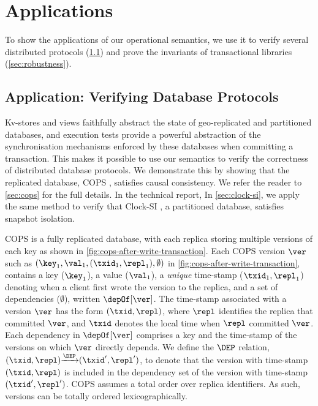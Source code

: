 \section{Applications}
\label{sec:applications}
\label{sec:program-analysis}

To show the applications of our operational semantics, 
we use it to verify several distributed protocols (\cref{sec:verify-impl}) and
prove the invariants of transactional libraries (\cref{sec:robustness}).

\subsection{Application: Verifying Database Protocols}
\label{sec:verify-impl}
Kv-stores and views faithfully abstract the state of geo-replicated and partitioned
databases, and execution tests provide a powerful abstraction of the synchronisation mechanisms 
enforced by these databases when committing a transaction. 
This makes it possible to use our 
semantics to verify the correctness of distributed database protocols. 
We demonstrate this by showing that the replicated database,
COPS \cite{cops}, satisfies causal consistency.
We refer the reader to \cref{sec:cops} for the full details.
\ifTechRepEdits%
In the technical report,
\else%
In \cref{sec:clock-si}, 
\fi
we apply the same method to verify that 
Clock-SI \cite{clocksi}, a partitioned database, satisfies snapshot isolation.



COPS is a fully replicated database, with each replica storing multiple versions of each key as shown in \cref{fig:cops-after-write-transaction}. 
Each COPS version \( \ver \)
such as \( (\key_1,\val_1,(\txid_1,\repl_1), \emptyset) \) in \cref{fig:cops-after-write-transaction},
contains a key ($\key_1$), a value ($\val_1$), a \emph{unique} time-stamp ($\txid_1, \repl_1$) denoting
when a client first wrote the version to the replica, 
and a set of dependencies ($\emptyset$), written $\depOf[\ver]$. 
The time-stamp associated with a version $\ver$ has the form $(\txid, \repl)$, where $\repl$ identifies the replica that committed $\ver$, 
and $\txid$ denotes the local time when $\repl$ committed $\ver$. 
Each dependency in $\depOf[\ver]$ comprises a key and the time-stamp of the versions on which $\ver$ directly depends.  
We define the \( \DEP \) relation, \( (\txid,\repl) {\xrightarrow{\DEP}} (\txid',\repl') \),
to denote that the version with time-stamp \( (\txid,\repl) \) is included in the dependency set of the version with time-stamp \( (\txid',\repl')\).
COPS assumes a total order over replica identifiers. 
As such, versions can be totally ordered lexicographically. 

